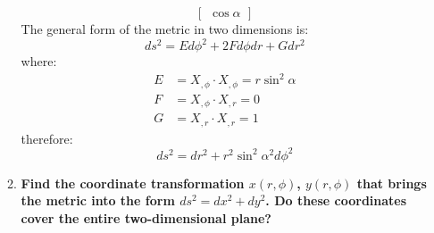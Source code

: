 \documentclass[9pt]{report}
\begin{document}
\begin{enumerate}
\begin{enumerate}
\[\begin{bmatrix}
            \cos\alpha
          \end{bmatrix}
        \]
        The general form of the metric in two dimensions is:
        \[
          ds^2 = E d\phi^2 + 2F d\phi dr + G dr^2
        \]
        where:
        \[
          \begin{align}
            E &= X_{,\phi} \cdot X_{,\phi} = r\sin^2\alpha \\
            F &= X_{,\phi} \cdot X_{,r} = 0\\
            G &= X_{,r} \cdot X_{,r} = 1
          \end{align}
        \]
        therefore:
        \[
          ds^2 = dr^2 + r^2\sin^2\alpha^2 d\phi^2
        \]

      \item \textbf{Find the coordinate transformation $x(r,\phi)$,
          $y(r,\phi)$ that brings the metric into the form $ds^2
        = dx^2+dy^2$. Do these coordinates cover the entire
        two-dimensional plane?}


\end{enumerate}
\end{enumerate}
\end{document}

